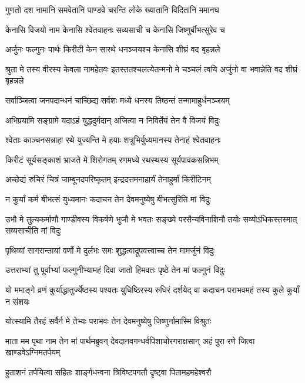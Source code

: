 \twolineshloka
{गुणतो दश नामानि समवेतानि पाण्डवे}
{चरन्ति लोके ख्यातानि विदितानि ममानघ}


\twolineshloka
{केनासि विजयो नाम केनासि श्वेतवाहनः}
{सव्यसाची च केनासि जिष्णुर्बीभत्सुरेव च}


\twolineshloka
{अर्जुनः फल्गुनः पार्थः किरीटी केन सारथे}
{धनञ्जयश्च केनासि शीघ्रं वद बृहन्नले}


\threelineshloka
{श्रुता मे तस्य वीरस्य केवला नामहेतवः}
{इतस्ततश्चलत्येतन्मनो मे चञ्चलं त्वयि}
{अर्जुनो वा भवान्नेति वद शीघ्रं बृहन्नले}




\twolineshloka
{सर्वाञ्जित्वा जनपदान्धनं चाच्छिद्य सर्वशः}
{मध्ये धनस्य तिष्ठन्तं तन्मामाहुर्धनञ्जयम्}


\twolineshloka
{अभिप्रयामि सङ्ग्रामे यदाऽहं युद्धदुर्मदान्}
{अजित्वा न निविर्तेयं तेन वै विजयं विदुः}


\twolineshloka
{श्वेताः काञ्चनसन्नाहा रथे युज्यन्ति मे हयाः}
{शत्रुभिर्युध्यमानस्य तेनाहं श्वेतवाहनः}


\twolineshloka
{किरीटं सूर्यसङ्काशं भ्राजते मे शिरोगतम्}
{रणमध्ये रथस्थस्य सूर्यपावकसन्निभम्}


\twolineshloka
{अच्छेद्यं रुचिरं चित्रं जाम्बूनदपरिष्कृतम्}
{इन्द्रदत्तमनाहार्यं तेनाहुर्मां किरीटिनम्}


\twolineshloka
{न कुर्यां कर्म बीभत्सं युध्यमानः कदाचन}
{तेन देवमनुष्येषु बीभत्सुरिति मां विदुः}


\threelineshloka
{उभौ मे तुल्यकर्माणौ गाण्डीवस्य विकर्षणे}
{भुजौ मे भवतः सङ्ख्ये परसैन्यविनाशिनौ}
{तयोः सव्योऽधिकस्तस्मात् सव्यसाचीति मां विदुः}


\twolineshloka
{पृथिव्यां सागरान्तायां वर्णो मे दुर्लभः समः}
{शुद्धत्वाद्रूपवत्त्वाच्च तेन मामर्जुनं विदुः}


\twolineshloka
{उत्तराभ्यां तु पूर्वाभ्यां फल्गुनीभ्यामहं दिवा}
{जातो हिमवतः पृष्ठे तेन मां फल्गुनं विदुः}


\threelineshloka
{यो ममाङ्गे व्रणं कुर्याद्धातुर्ज्येष्ठस्य पश्यतः}
{युधिष्ठिरस्य रुधिरं दर्शयेद् वा कदाचन}
{पराभवमहं तस्य कुले कुर्यां न संशयः}


\twolineshloka
{योत्स्यामि तैरहं सर्वैर्न मे तेभ्यः पराभवः}
{तेन देवमनुष्येषु जिष्णुर्नामास्मि विश्रुतः}


\onelineshloka
{माता मम पृथा नाम तेन मां पार्थमब्रुवन्}
\twolineshloka
{देवदानवगन्धर्वपिशाचोरगराक्षसान्}
{अहं पुरा रणे जित्वा खाण्डवेऽग्निमतर्पयम्}


\twolineshloka
{हुताशनं तर्पयित्वा सहितः शार्ङ्गधन्वना}
{त्रिविष्टपगतौ दृष्ट्वा पितामहमहेश्वरौ}


